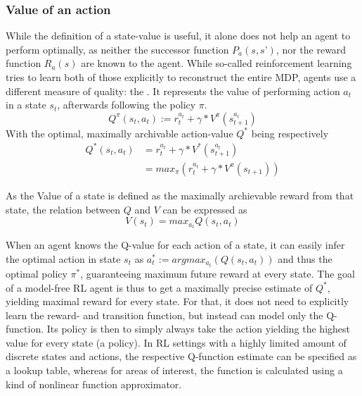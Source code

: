\subsubsection{Value of an action}
While the definition of a state-value is useful, it alone does not help an agent to perform optimally, as neither the successor function $P_a(s,s’)$, nor the reward function $R_a(s)$ are known to the agent. While so-called  reinforcement learning tries to learn both of those explicitly to reconstruct the entire MDP,  agents use a different measure of quality: the . It represents the value of performing action $a_t$ in a state $s_t$, afterwards following the policy $\pi$.
\begin{equation} \label{eq:1.2}
Q^\pi(s_t,a_t) := r_t^{a_t} + \gamma * V^\pi(s_{t+1}^{a_t})
\end{equation}
With the optimal, maximally archivable action-value $Q^*$ being respectively
\begin{align}
Q^*(s_t,a_t) &= r_t^{a_t} + \gamma * V^*(s_{t+1}^{a_t}) \\
&= max_\pi ( r_t^{a_t} + \gamma * V^\pi(s_{t+1}))
\end{align}

As the Value of a state is defined as the maximally archievable reward from that state, the relation between $Q$ and $V$ can be expressed as 
\begin{equation} \label{eq:1.25}
V(s_t) = max_{a_t} Q(s_t, a_t)
\end{equation}

When an agent knows the Q-value for each action of a state, it can easily infer the optimal action in state $s_t$ as $a^*_t := argmax_{a_t}(Q(s_t, a_t))$ and thus the optimal policy $\pi^*$, %
guaranteeing maximum future reward at every state. The goal of a model-free RL agent is thus to get a maximally precise estimate of $Q^*$, yielding maximal reward for every state. For that, it does not need to explicitly learn the reward- and transition function, but instead can model only the Q-function. Its policy is then to simply always take the action yielding the highest value for every state (a  policy).  In RL settings with a highly limited amount of discrete states and actions, the respective Q-function estimate can be specified as a lookup table, whereas for areas of interest, the function is calculated using a kind of nonlinear function approximator. 

